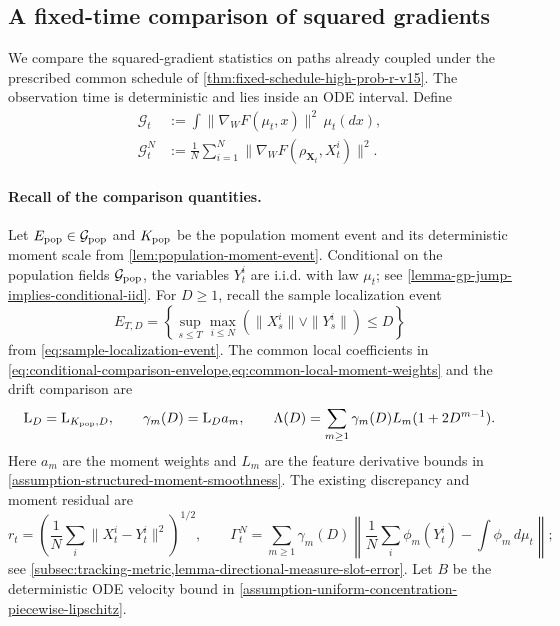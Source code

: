 
\subsection{A fixed-time comparison of squared gradients}
\label{subsec:trigger-stability}

We compare the squared-gradient statistics on paths already coupled under
the prescribed common schedule of \cref{thm:fixed-schedule-high-prob-r-v15}.
The observation time is deterministic and lies inside an ODE interval.
Define
\begin{equation}
\begin{split}
 \mathcal G_t&:=\int\|\nabla_WF(\mu_t,x)\|^2\,\mu_t(dx),\\
 \mathcal G_t^N&:=\frac1N\sum_{i=1}^N
       \|\nabla_WF(\rho_{\mathbf X_t},X_t^i)\|^2.
\end{split}
\label{eq:def-trigger-functional-squared}
\end{equation}

\paragraph{Recall of the comparison quantities.}
Let $E_{\rm pop}\in\mathcal G_{\rm pop}$ and $K_{\rm pop}$ be the
population moment event and its deterministic moment scale from
\cref{lem:population-moment-event}. Conditional on the population fields
$\mathcal G_{\rm pop}$, the variables $Y_t^i$ are i.i.d. with law $\mu_t$;
see \cref{lemma-gp-jump-implies-conditional-iid}.
For $D\ge1$, recall the sample localization event
\[
 E_{T,D}=\left\{\sup_{s\le T}\max_{i\le N}
          (\|X_s^i\|\vee\|Y_s^i\|)\le D\right\}
\]
from \cref{eq:sample-localization-event}.
The common local coefficients in
\cref{eq:conditional-comparison-envelope,eq:common-local-moment-weights}
and the drift comparison are
\[
 \mathrm L_D=\mathrm L_{K_{\rm pop},D},\qquad
 \gamma_m(D)=\mathrm L_Da_m,\qquad
 \Lambda(D)=\sum_{m\ge1}\gamma_m(D)L_m(1+2D^{m-1}).
\]
Here $a_m$ are the moment weights and $L_m$ are the feature derivative
bounds in \cref{assumption-structured-moment-smoothness}. The existing
discrepancy and moment residual are
\[
 r_t=\left(\frac1N\sum_i\|X_t^i-Y_t^i\|^2\right)^{1/2},\qquad
 \Gamma_t^N=\sum_{m\ge1}\gamma_m(D)
 \left\|\frac1N\sum_i\phi_m(Y_t^i)-\int\phi_m\,d\mu_t\right\|;
\]
see \cref{subsec:tracking-metric,lemma-directional-measure-slot-error}.
Let $B$ be the deterministic ODE velocity bound in
\cref{assumption-uniform-concentration-piecewise-lipschitz}.

